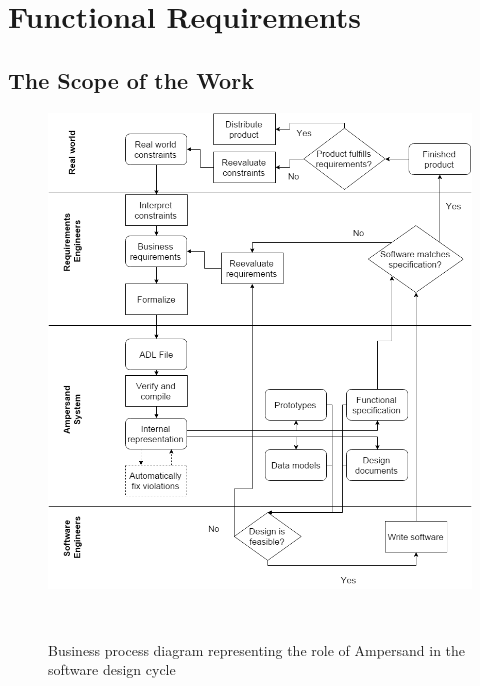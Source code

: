 \documentclass[12pt]{report}
\begin{document}
\chapter{Functional Requirements}\label{ch:Functional}
\section{The Scope of the Work}\label{sec:ScopeOfWork}

\begin{figure}[!htb]
\begin{center}
\includegraphics[width=\textwidth]{../figures/business_process}
\caption{Business process diagram representing the role of Ampersand in the
  software design cycle}~\label{fig:BusinessProcess}
\end{center}
\end{figure}

%
\end{document}
